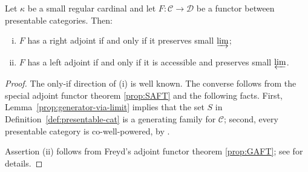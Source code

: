 \begin{theorem}
	Let $\kappa$ be a small regular cardinal and let $F:\mathcal{C}\to\mathcal{D}$ be a functor between presentable categories. Then:
	\begin{enumerate}[(i)]
		\item $F$ has a right adjoint if and only if it preserves small $\varinjlim$;
		\item $F$ has a left adjoint if and only if it is accessible and preserves small $\varprojlim$.
	\end{enumerate}
\end{theorem}
\begin{proof}
	The only-if direction of (i) is well known. The converse follows from the special adjoint functor theorem \ref{prop:SAFT} and the following facts. First, Lemma~\ref{prop:generator-via-limit} implies that the set $S$ in Definition~\ref{def:presentable-cat} is a generating family for $\mathcal{C}$; second, every presentable category is co-well-powered, by \cite[Theorem 1.58]{AR94}.

	Assertion (ii) follows from Freyd's adjoint functor theorem \ref{prop:GAFT}; see \cite[Theorem 1.66]{AR94} for details.
\end{proof}
